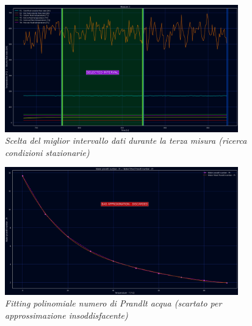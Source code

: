 \documentclass[a4paper,10pt]{article}                                                                                       %
\begin{document}
\begin{figure}[H]                                                                                                           %
  \centering                                                                                                                %
  \includegraphics[width=0.9\textwidth]{../final_doc/code_exports/imgs/measure3.png}                                        %
  \caption{\textit{Scelta del miglior intervallo dati durante la terza misura (ricerca condizioni stazionarie)}}            %
  \label{fig:measure1}                                                                                                      %
\end{figure}                                                                                                                %
\begin{figure}[H]                                                                                                           %
  \centering                                                                                                                %
  \includegraphics[width=0.9\textwidth]{../final_doc/code_exports/imgs/water_fitted_pr.png}                                 %
  \caption{\textit{Fitting polinomiale numero di Prandlt acqua (scartato per approssimazione insoddisfacente)}}             %
  \label{fig:water_fitted_pr}                                                                                               %
\end{figure}                                                                                                                %
\end{document}
